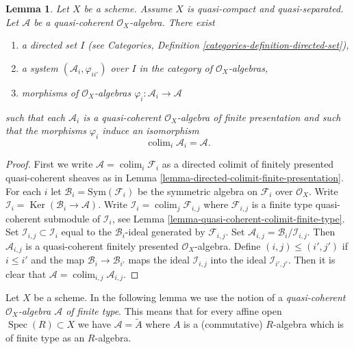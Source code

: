 \documentclass{stacks-project}
\theoremstyle{plain}
\newtheorem{lemma}[subsection]{Lemma}
\theoremstyle{definition}
\theoremstyle{remark}
\numberwithin{equation}{subsection}
\def\colim{\mathop{\mathrm{colim}}\nolimits}
\def\Spec{\mathop{\mathrm{Spec}}}
\def\Ker{\mathop{\mathrm{Ker}}}
\begin{document}
\begin{lemma}
\label{lemma-algebra-directed-colimit-finite-presentation}
Let $X$ be a scheme. Assume $X$ is quasi-compact and quasi-separated.
Let $\mathcal{A}$ be a quasi-coherent $\mathcal{O}_X$-algebra.
There exist
\begin{enumerate}
\item a directed set $I$ (see
Categories, Definition \ref{categories-definition-directed-set}),
\item a system $(\mathcal{A}_i, \varphi_{ii'})$
over $I$ in the category of $\mathcal{O}_X$-algebras,
\item morphisms of $\mathcal{O}_X$-algebras
$\varphi_i : \mathcal{A}_i \to \mathcal{A}$
\end{enumerate}
such that each $\mathcal{A}_i$ is a quasi-coherent $\mathcal{O}_X$-algebra
of finite presentation and such that the morphisms $\varphi_i$
induce an isomorphism
$$
\colim_i \mathcal{A}_i
=
\mathcal{A}.
$$
\end{lemma}

\begin{proof}
First we write $\mathcal{A} = \colim_i \mathcal{F}_i$ as a directed
colimit of finitely presented quasi-coherent sheaves as in
Lemma \ref{lemma-directed-colimit-finite-presentation}.
For each $i$ let $\mathcal{B}_i = \text{Sym}(\mathcal{F}_i)$ be the
symmetric algebra on $\mathcal{F}_i$ over $\mathcal{O}_X$. Write
$\mathcal{I}_i = \Ker(\mathcal{B}_i \to \mathcal{A})$. Write
$\mathcal{I}_i = \colim_j \mathcal{F}_{i, j}$ where
$\mathcal{F}_{i, j}$ is a finite type quasi-coherent submodule of
$\mathcal{I}_i$, see
Lemma \ref{lemma-quasi-coherent-colimit-finite-type}.
Set $\mathcal{I}_{i, j} \subset \mathcal{I}_i$
equal to the $\mathcal{B}_i$-ideal generated by $\mathcal{F}_{i, j}$.
Set $\mathcal{A}_{i, j} = \mathcal{B}_i/\mathcal{I}_{i, j}$.
Then $\mathcal{A}_{i, j}$ is a quasi-coherent finitely presented
$\mathcal{O}_X$-algebra. Define $(i, j) \leq (i', j')$ if
$i \leq i'$ and the map $\mathcal{B}_i \to \mathcal{B}_{i'}$
maps the ideal $\mathcal{I}_{i, j}$ into the ideal $\mathcal{I}_{i', j'}$.
Then it is clear that $\mathcal{A} = \colim_{i, j} \mathcal{A}_{i, j}$.
\end{proof}

\noindent
Let $X$ be a scheme. In the following lemma we use the notion
of a {\it quasi-coherent $\mathcal{O}_X$-algebra $\mathcal{A}$
of finite type}. This means that for every affine open
$\Spec(R) \subset X$ we have $\mathcal{A} = \widetilde{A}$
where $A$ is a (commutative) $R$-algebra which is of finite type
as an $R$-algebra.
\end{document}
